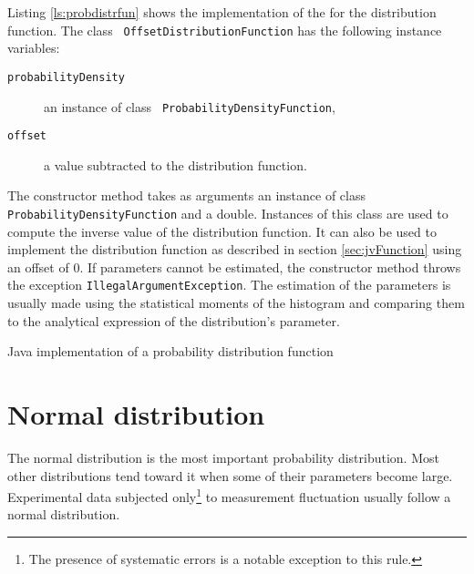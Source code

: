 \documentclass[twoside]{book}
\begin{document}
Listing \ref{ls:probdistrfun} shows the implementation of the
 for the distribution function. The class {\tt
OffsetDistributionFunction} has the following instance variables:
\begin{description}
  \item[\tt probabilityDensity] an instance of class {\tt
  ProbabilityDensityFunction},
  \item[\tt offset] a value subtracted to the distribution
  function.
\end{description}
The constructor method takes as arguments an instance of class
{\tt ProbabilityDensityFunction} and a double. Instances of this
class are used to compute the inverse value of the distribution
function. It can also be used to implement the distribution
function as described in section \ref{sec:jvFunction} using an
offset of 0. If parameters cannot be estimated, the constructor
method throws the exception {\tt IllegalArgumentException}. The
estimation of the parameters is usually made using the statistical
moments of the histogram and comparing them to the analytical
expression of the distribution's parameter.

\begin{listing} Java implementation of a probability distribution function
\label{lj:probdistrfun}

\end{listing}


\section{Normal distribution}
\label{sec:normdist} The normal distribution is the most important
probability distribution. Most other distributions tend toward it
when some of their parameters become large. Experimental data
subjected only\footnote{The presence of systematic errors is a
notable exception to this rule.} to measurement fluctuation
usually follow a normal distribution.
\end{document}
